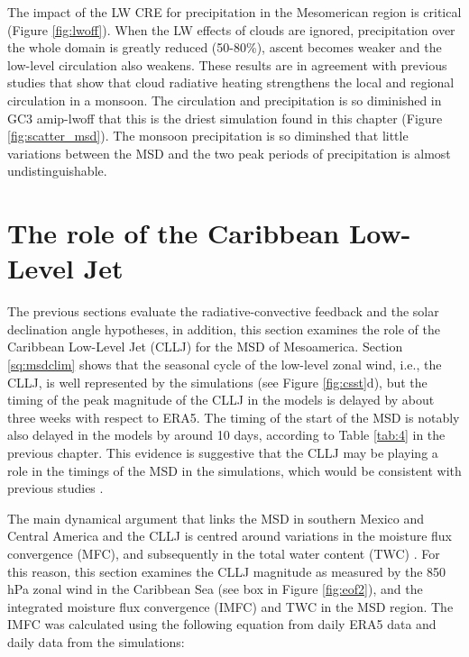The impact of the LW CRE for precipitation in the Mesomerican region is critical (Figure \ref{fig:lwoff}). When the LW effects of clouds are ignored, precipitation over the whole domain is greatly reduced (50-80\%), ascent becomes weaker and the low-level circulation also weakens. 
These results are in agreement with previous studies \citep{guo2015,byrne2020} that show that cloud radiative heating strengthens the local and regional circulation in a monsoon. The circulation and precipitation is so diminished in GC3 amip-lwoff that this is the driest simulation found in this chapter (Figure \ref{fig:scatter_msd}). The monsoon precipitation is so diminshed that little variations between the MSD and the two peak periods of precipitation is almost undistinguishable. 





\section{The role of the Caribbean Low-Level Jet}



The previous sections evaluate the radiative-convective feedback and the solar declination angle hypotheses, in addition, this section examines the role of the Caribbean Low-Level Jet (CLLJ) for the MSD of Mesoamerica. Section \ref{sq:msdclim} shows that the seasonal cycle of the low-level zonal wind, i.e., the CLLJ, is well represented by the simulations (see Figure \ref{fig:csst}d), but the timing of the peak magnitude of the CLLJ in the models is delayed by about three weeks with respect to ERA5. The timing of the start of the MSD is notably also delayed in the models by around 10 days, according to Table \ref{tab:4} in the previous chapter. This evidence is suggestive that the CLLJ may be playing a role in the timings of the MSD in the simulations, which would be consistent with previous studies \citep[e.g.][]{herrera2015,martinez2019}.


The main dynamical argument that links the MSD in southern Mexico and Central America and the CLLJ is centred around variations in the moisture flux convergence (MFC), and subsequently in the total water content (TWC) \citep[see e.g.][]{gamble2008,herrera2015,martinez2019,zermeno2019}. For this reason, this section examines the CLLJ magnitude as measured by the 850 hPa zonal wind in the Caribbean Sea (see box in Figure \ref{fig:eof2}), and the integrated moisture flux convergence (IMFC) and TWC in the MSD region. 
The IMFC was calculated using the following equation from daily ERA5 data and daily data from the simulations:

